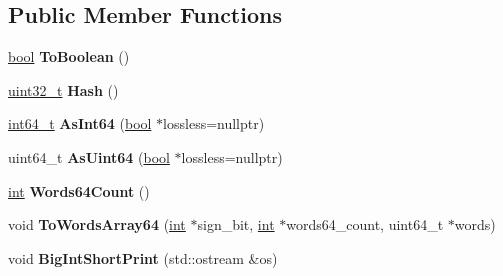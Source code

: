 \subsection*{Public Member Functions}
\begin{DoxyCompactItemize}
\item 
\mbox{\label{classv8_1_1internal_1_1BigInt_a9a1646f29fdc3c92d223a1ad46d3c282}} 
\mbox{\hyperlink{classbool}{bool}} {\bfseries To\+Boolean} ()
\item 
\mbox{\label{classv8_1_1internal_1_1BigInt_a5571b054ddb0b1cefe7b11312795c805}} 
\mbox{\hyperlink{classuint32__t}{uint32\+\_\+t}} {\bfseries Hash} ()
\item 
\mbox{\label{classv8_1_1internal_1_1BigInt_a057c028277687dce2c2d8ef45b292359}} 
\mbox{\hyperlink{classint64__t}{int64\+\_\+t}} {\bfseries As\+Int64} (\mbox{\hyperlink{classbool}{bool}} $\ast$lossless=nullptr)
\item 
\mbox{\label{classv8_1_1internal_1_1BigInt_adc126d4a907861d07704fe1e43b3c5a8}} 
uint64\+\_\+t {\bfseries As\+Uint64} (\mbox{\hyperlink{classbool}{bool}} $\ast$lossless=nullptr)
\item 
\mbox{\label{classv8_1_1internal_1_1BigInt_a9b1c7b72c86e46cdc0fea6b737598fa3}} 
\mbox{\hyperlink{classint}{int}} {\bfseries Words64\+Count} ()
\item 
\mbox{\label{classv8_1_1internal_1_1BigInt_ab0e7a4b3be15ad1b0efae339f4888fd0}} 
void {\bfseries To\+Words\+Array64} (\mbox{\hyperlink{classint}{int}} $\ast$sign\+\_\+bit, \mbox{\hyperlink{classint}{int}} $\ast$words64\+\_\+count, uint64\+\_\+t $\ast$words)
\item 
\mbox{\label{classv8_1_1internal_1_1BigInt_aa373f8aecc298760f6af6b8431c2f70a}} 
void {\bfseries Big\+Int\+Short\+Print} (std\+::ostream \&os)
\end{DoxyCompactItemize}
